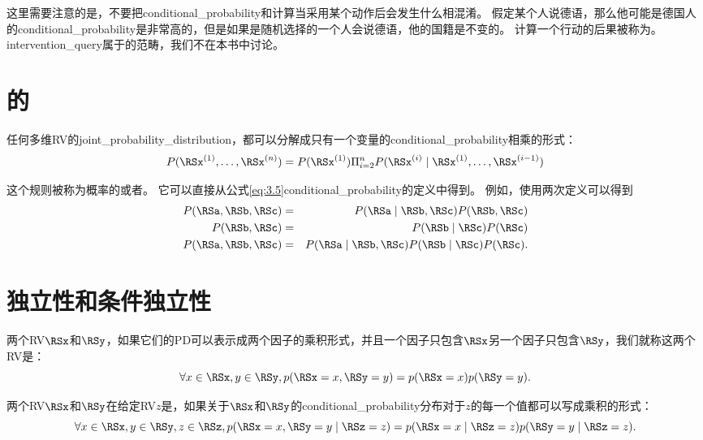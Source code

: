这里需要注意的是，不要把\gls{conditional_probability}和计算当采用某个动作后会发生什么相混淆。
假定某个人说德语，那么他可能是德国人的\gls{conditional_probability}是非常高的，但是如果是随机选择的一个人会说德语，他的国籍是不变的。
计算一个行动的后果被称为。
\gls{intervention_query}属于的范畴，我们不在本书中讨论。

\section{的}
\label{sec:the_chain_rule_of_conditional_probabilities}

任何多维\gls{RV}的\gls{joint_probability_distribution}，都可以分解成只有一个变量的\gls{conditional_probability}相乘的形式：
\begin{equation}
P(\RSx^{(1)}, \ldots, \RSx^{(n)}) = P(\RSx^{(1)}) \Pi_{i=2}^n P(\RSx^{(i)} \mid \RSx^{(1)}, \ldots, \RSx^{(i-1)})
\label{eq:chap3_chain_rule}
\end{equation}


这个规则被称为概率的或者。
它可以直接从公式\ref{eq:3.5}\gls{conditional_probability}的定义中得到。
例如，使用两次定义可以得到
\begin{eqnarray*}
P(\RSa, \RSb, \RSc) &=& P(\RSa \mid \RSb, \RSc) P(\RSb, \RSc)\\
P(\RSb, \RSc) &=& P(\RSb \mid \RSc) P(\RSc)\\
P(\RSa, \RSb, \RSc) &=& P(\RSa \mid \RSb, \RSc) P(\RSb \mid \RSc) P(\RSc).
\end{eqnarray*}

\section{独立性和条件独立性}
\label{sec:independence_and_conditional_independence}

两个\gls{RV}$\RSx$和$\RSy$，如果它们的\gls{PD}可以表示成两个因子的乘积形式，并且一个因子只包含$\RSx$另一个因子只包含$\RSy$，我们就称这两个\gls{RV}是：
\begin{equation}
\forall x \in \RSx, y \in \RSy, p(\RSx = x, \RSy = y) = p(\RSx = x)p(\RSy = y).
\end{equation}

两个\gls{RV}$\RSx$和$\RSy$在给定\gls{RV}$z$是，如果关于$\RSx$和$\RSy$的\gls{conditional_probability}分布对于$z$的每一个值都可以写成乘积的形式：
\begin{equation}
\forall x \in \RSx, y \in \RSy, z \in \RSz, p( \RSx=x, \RSy=y \mid \RSz=z) =
p(\RSx = x \mid \RSz = z) p(\RSy = y \mid \RSz = z).
\end{equation}

